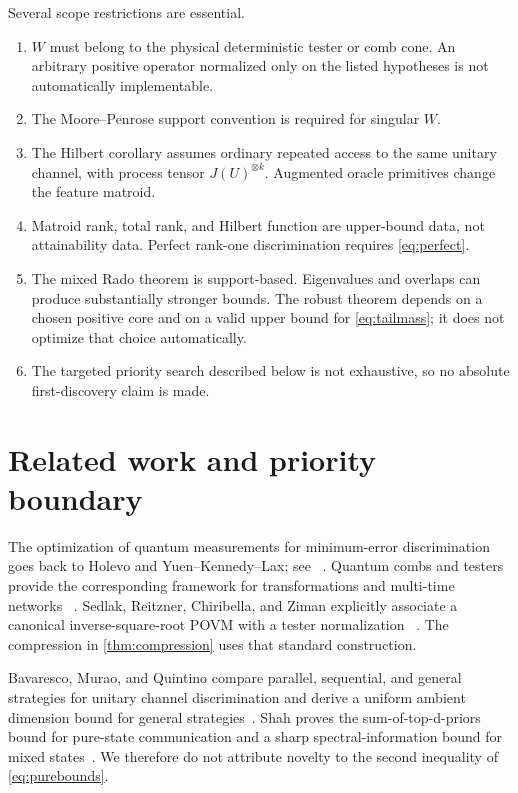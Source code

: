 \documentclass[11pt]{article}
\theoremstyle{definition}
\theoremstyle{remark}
\begin{document}
Several scope restrictions are essential.

\begin{enumerate}
\item $W$ must belong to the physical deterministic tester or comb cone.
An arbitrary positive operator normalized only on the listed hypotheses is
not automatically implementable.
\item The Moore--Penrose support convention is required for singular $W$.
\item The Hilbert corollary assumes ordinary repeated access to the same
unitary channel, with process tensor $J(U)^{\otimes k}$.  Augmented oracle
primitives change the feature matroid.
\item Matroid rank, total rank, and Hilbert function are upper-bound data, not
attainability data.  Perfect rank-one discrimination requires
\cref{eq:perfect}.
\item The mixed Rado theorem is support-based.  Eigenvalues and overlaps can
produce substantially stronger bounds.  The robust theorem depends on a
chosen positive core and on a valid upper bound for \cref{eq:tailmass}; it does
not optimize that choice automatically.
\item The targeted priority search described below is not exhaustive, so no
absolute first-discovery claim is made.
\end{enumerate}

\section{Related work and priority boundary}

The optimization of quantum measurements for minimum-error discrimination
goes back to Holevo and Yuen--Kennedy--Lax; see
~\cite{yuen1975,helstrom1976,watrous2018}.  Quantum combs and testers provide
the corresponding framework for transformations and multi-time networks
~\cite{chiribella2009}.  Sedlak, Reitzner, Chiribella, and Ziman explicitly
associate a canonical inverse-square-root POVM with a tester normalization
~\cite{sedlak2016}.  The compression in \cref{thm:compression} uses that
standard construction.

Bavaresco, Murao, and Quintino compare parallel, sequential, and general
strategies for unitary channel discrimination and derive a uniform ambient
dimension bound for general strategies~\cite{bavaresco2022}.  Shah proves the
sum-of-top-d-priors bound for pure-state communication and a sharp
spectral-information bound for mixed states~\cite{shah2025}.  We therefore do
not attribute novelty to the second inequality of \cref{eq:purebounds}.
\end{document}
